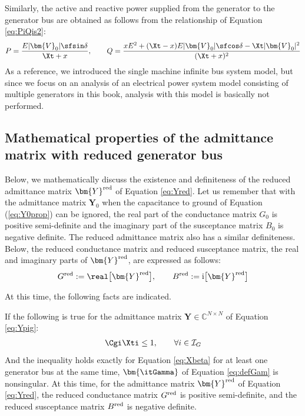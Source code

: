 \documentclass[graybox, envcountchap]{svmult}
\begin{document}
Similarly, the active and reactive power supplied from the generator to the generator bus are obtained as follows from the relationship of Equation \ref{eq:PiQis2}:
\[
P=\frac{
E|\bm{V}_0|\sfsin\delta
}{
\Xt + x
}
,\qquad
Q=
\frac{
x E^2 + (\Xt - x )E|\bm{V}_0|\sfcos\delta
- \Xt |\bm{V}_0|^2
}{
( \Xt + x )^2
}
\]
As a reference, we introduced the single machine infinite bus system model, but since we focus on an analysis of an electrical power system model consisting of multiple generators in this book, analysis with this model is basically not performed.


\subsection{Mathematical properties of the admittance matrix with reduced generator bus}

Below, we mathematically discuss the existence and definiteness of the reduced admittance matrix $\bm{Y}^{\rm red}$ of Equation \ref{eq:Yred}.
Let us remember that with the admittance matrix $\bm{Y}_0$ when the capacitance to ground of Equation (\ref{eq:Y0prop}) can be ignored, the real part of the conductance matrix $G_0$ is positive semi-definite and the imaginary part of the susceptance matrix $B_0$ is negative definite.
The reduced admittance matrix also has a similar definiteness.
Below, the reduced conductance matrix and reduced susceptance matrix, the real and imaginary parts of $\bm{Y}^{\rm red}$, are expressed as follows:
\begin{align}\label{eq:GredBred}
G^{\rm red} :=\real\bigl[\bm{Y}^{\rm red}\bigr] ,\qquad
B^{\rm red} :=\imag\bigl[\bm{Y}^{\rm red}\bigr] 
\end{align}

At this time, the following facts are indicated.


\begin{theorem}
\label{thm:redadmat}
If the following is true for the admittance matrix $\bm{Y}\in \mathbb{C}^{N\times N}$ of Equation \ref{eq:Ypig}:
\begin{align}\label{eq:Xbeta}
\Cgi \Xti \leq 1
,\qquad \forall i \in \mathcal{I}_G
\end{align}
And the inequality holds exactly for Equation \ref{eq:Xbeta} for at least one generator bus at the same time, $\bm{\itGamma}$ of Equation \ref{eq:defGam} is nonsingular.
At this time, for the admittance matrix $\bm{Y}^{\rm red}$ of Equation \ref{eq:Yred}, the reduced conductance matrix $G^{\rm red}$ is positive semi-definite, and the reduced susceptance matrix $B^{\rm red}$ is negative definite.
\end{theorem}
\end{document}
